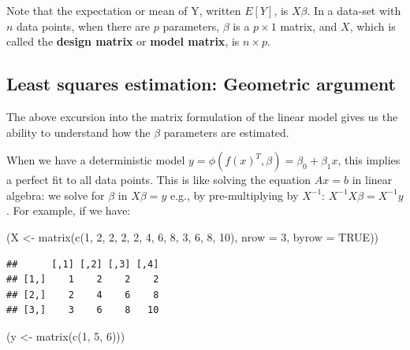 \documentclass[
  12pt,
]{krantz}
\newenvironment{Shaded}{\begin{snugshade}}{\end{snugshade}}
\newcommand{\AttributeTok}[1]{\textcolor[rgb]{0.77,0.63,0.00}{#1}}
\newcommand{\ConstantTok}[1]{\textcolor[rgb]{0.00,0.00,0.00}{#1}}
\newcommand{\DecValTok}[1]{\textcolor[rgb]{0.00,0.00,0.81}{#1}}
\newcommand{\FunctionTok}[1]{\textcolor[rgb]{0.00,0.00,0.00}{#1}}
\newcommand{\NormalTok}[1]{#1}
\newcommand{\OtherTok}[1]{\textcolor[rgb]{0.56,0.35,0.01}{#1}}
\theoremstyle{definition}
\theoremstyle{definition}
\theoremstyle{definition}
\theoremstyle{definition}
\theoremstyle{remark}
\begin{document}
Note that the expectation or mean of Y, written \(E[Y]\), is \(X\beta\). In a data-set with \(n\) data points, when there are \(p\) parameters, \(\beta\) is a \(p\times 1\) matrix, and \(X\), which is called the \textbf{design matrix} or \textbf{model matrix}, is \(n\times p\).

\hypertarget{least-squares-estimation-geometric-argument}{%
\subsection{Least squares estimation: Geometric argument}\label{least-squares-estimation-geometric-argument}}

The above excursion into the matrix formulation of the linear model gives us the ability to understand how the \(\beta\) parameters are estimated.

When we have a deterministic model \(y=\phi(f(x)^T,\beta)=\beta_0+\beta_1x\), this implies a perfect fit to all data points.
This is like solving the equation \(Ax=b\) in linear algebra: we solve for \(\beta\) in \(X\beta=y\) e.g., by pre-multiplying by \(X^{-1}\): \(X^{-1}X\beta=X^{-1}y\). For example, if we have:

\begin{Shaded}
\begin{Highlighting}[]
\NormalTok{(X }\OtherTok{\textless{}{-}} \FunctionTok{matrix}\NormalTok{(}\FunctionTok{c}\NormalTok{(}\DecValTok{1}\NormalTok{, }\DecValTok{2}\NormalTok{, }\DecValTok{2}\NormalTok{, }\DecValTok{2}\NormalTok{, }\DecValTok{2}\NormalTok{, }\DecValTok{4}\NormalTok{, }\DecValTok{6}\NormalTok{, }\DecValTok{8}\NormalTok{, }\DecValTok{3}\NormalTok{, }\DecValTok{6}\NormalTok{, }\DecValTok{8}\NormalTok{, }\DecValTok{10}\NormalTok{), }\AttributeTok{nrow =} \DecValTok{3}\NormalTok{, }\AttributeTok{byrow =} \ConstantTok{TRUE}\NormalTok{))}
\end{Highlighting}
\end{Shaded}

\begin{verbatim}
##      [,1] [,2] [,3] [,4]
## [1,]    1    2    2    2
## [2,]    2    4    6    8
## [3,]    3    6    8   10
\end{verbatim}

\begin{Shaded}
\begin{Highlighting}[]
\NormalTok{(y }\OtherTok{\textless{}{-}} \FunctionTok{matrix}\NormalTok{(}\FunctionTok{c}\NormalTok{(}\DecValTok{1}\NormalTok{, }\DecValTok{5}\NormalTok{, }\DecValTok{6}\NormalTok{)))}
\end{Highlighting}
\end{Shaded}
\end{document}
